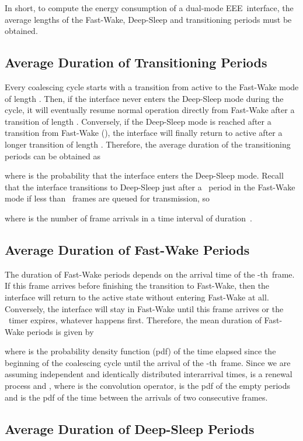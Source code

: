 \documentclass[journal,10pt,letterpaper]{IEEEtran}
\begin{document}
In short, to compute the energy consumption of a dual-mode
EEE~interface, the average lengths of the Fast-Wake, Deep-Sleep and
transitioning periods must be obtained.

\subsection{Average Duration of Transitioning Periods}
\label{sec:trans}

Every coalescing cycle starts with a transition from active to the
Fast-Wake mode of length . Then, if the interface
never enters the Deep-Sleep mode during the cycle, it will eventually
resume normal operation directly from Fast-Wake after a transition of
length . Conversely, if the Deep-Sleep mode is
reached after a transition from Fast-Wake (), the
interface will finally return to active after a longer transition of
length . Therefore, the average duration of the
transitioning periods can be obtained as

where  is the probability that the interface enters
the Deep-Sleep mode. Recall that the interface transitions to
Deep-Sleep just after a ~period in the Fast-Wake
mode if less than ~frames are queued for transmission,
so

where  is the number of frame arrivals in a time interval of
duration~. 

\subsection{Average Duration of Fast-Wake Periods}
\label{sec:fast}

The duration of Fast-Wake periods depends on the arrival time of the
-th~frame. If this frame arrives before finishing the
transition to Fast-Wake, then the interface will return to the active
state without entering Fast-Wake at all. Conversely, the interface
will stay in Fast-Wake until this frame arrives or the
~timer expires, whatever happens first. Therefore,
the mean duration of Fast-Wake periods is given by

where  is the probability density function
(pdf) of the time elapsed since the beginning of the coalescing cycle
until the arrival of the -th~frame. Since we are
assuming independent and identically distributed interarrival times,
 is a renewal process and , where  is
the convolution operator,  is the pdf of the
empty periods and  is the pdf of the time between the arrivals
of two consecutive frames.

\subsection{Average Duration of Deep-Sleep Periods}
\label{sec:deep}
\end{document}
